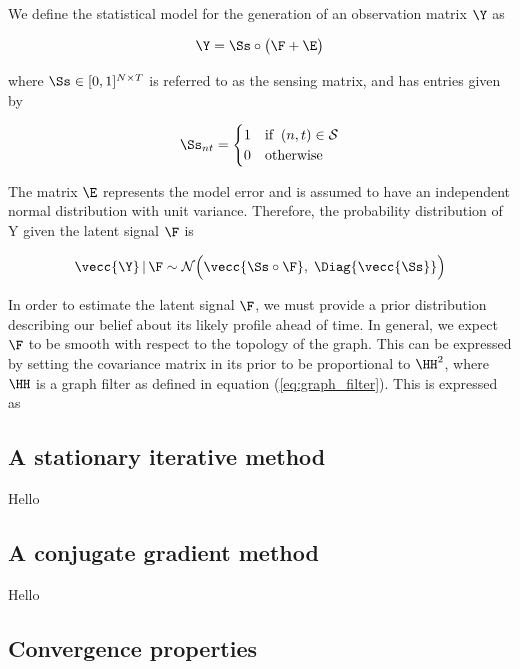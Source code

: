 We define the statistical model for the generation of an observation matrix $\Y$ as 

\begin{equation}
    \Y = \Ss \circ \big(\F + \E \big)
\end{equation}

where $\Ss \in [0, 1]^{N \times T}$ is referred to as the sensing matrix, and has entries given by 

\begin{equation}
    \Ss_{nt} = \begin{cases}
        1 & \text{if} \;\; (n, t) \in \mathcal{S} \\
        0 & \text{otherwise}
    \end{cases}
\end{equation}

The matrix $\E$ represents the model error and is assumed to have an independent normal distribution with unit variance. Therefore, the probability distribution of Y given the latent signal $\F$ is

\begin{equation}
    \label{eq:Y_given_F}
    \vecc{\Y} \, | \, \F \sim \mathcal{N}\Big(\vecc{\Ss \circ \F}, \; \Diag{\vecc{\Ss}}\Big)
\end{equation}

In order to estimate the latent signal $\F$, we must provide a prior distribution describing our belief about its likely profile ahead of time. In general, we expect $\F$ to be smooth with respect to the topology of the graph. This can be expressed by setting the covariance matrix in its prior to be proportional to $\HH^2$, where $\HH$ is a graph filter as defined in equation (\ref{eq:graph_filter}). This is expressed as

\subsection{A stationary iterative method}

Hello

\subsection{A conjugate gradient method}

Hello

\subsection{Convergence properties}

